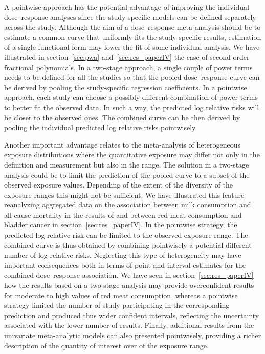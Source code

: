 \documentclass[11pt,a4paper,twoside,openany]{book}\usepackage{knitr}
\begin{document}
{A pointwise approach has the potential advantage of improving the individual dose--response analyses since the study-specific models can be defined separately across the study. Although the aim of a dose--response meta-analysis should be to estimate a common curve that uniformly fits the study-specific results, estimation of a single functional form may lower the fit of some individual analysis. We have illustrated in section~\ref{sec:pwa} and~\ref{sec:res_paperIV} the case of second order fractional polynomials. In a two-stage approach, a single couple of power terms needs to be defined for all the studies so that the pooled dose--response curve can be derived by pooling the study-specific regression coefficients. In a pointwise approach, each study can choose a possibly different combination of power terms to better fit the observed data. In such a way, the predicted log relative risks will be closer to the observed ones. The combined curve can be then derived by pooling the individual predicted log relative risks pointwisely.

Another important advantage relates to the meta-analysis of heterogeneous exposure distributions where the quantitative exposure may differ not only in the definition and measurement but also in the range. The solution in a two-stage analysis could be to limit the prediction of the pooled curve to a subset of the observed exposure values. Depending of the extent of the diversity of the exposure ranges this might not be sufficient. We have illustrated this feature reanalyzing aggregated data on the association between milk consumption and all-cause mortality in the results of  and between red meat consumption and bladder cancer in section~\ref{sec:res_paperIV}. In the pointwise strategy, the predicted log relative risk can be limited to the observed exposure range. The combined curve is thus obtained by combining pointwisely a potential different number of log relative risks. Neglecting this type of heterogeneity may have important consequences both in terms of point and interval estimates for the combined dose--response association. We have seen in section~\ref{sec:res_paperIV} how the results based on a two-stage analysis may provide overconfident results for moderate to high values of red meat consumption, whereas a pointwise strategy limited the number of study participating in the corresponding prediction and produced thus wider confident intervals, reflecting the uncertainty associated with the lower number of results. Finally, additional results from the univariate meta-analytic models can also presented pointwisely, providing a richer description of the quantity of interest over of the exposure range.

}
\end{document}
